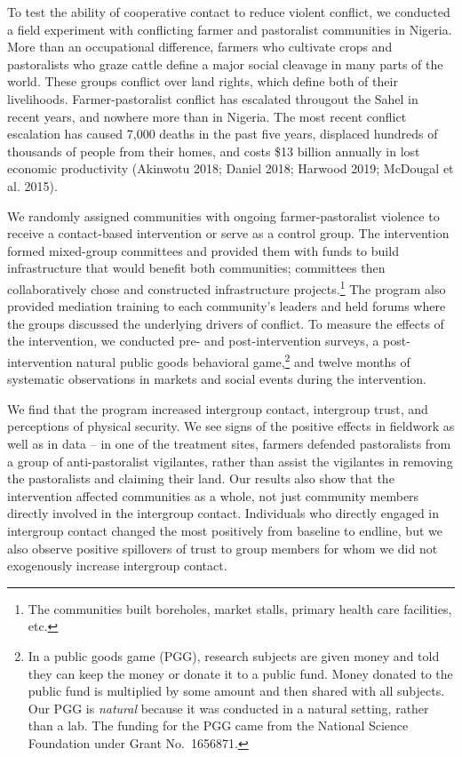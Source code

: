 \documentclass[11pt]{article}
\begin{document}
To test the ability of cooperative contact to reduce violent conflict,
we conducted a field experiment with conflicting farmer and pastoralist
communities in Nigeria. More than an occupational difference, farmers
who cultivate crops and pastoralists who graze cattle define a major
social cleavage in many parts of the world. These groups conflict over
land rights, which define both of their livelihoods. Farmer-pastoralist
conflict has escalated througout the Sahel in recent years, and nowhere
more than in Nigeria. The most recent conflict escalation has caused
7,000 deaths in the past five years, displaced hundreds of thousands of
people from their homes, and costs \$13 billion annually in lost
economic productivity (Akinwotu 2018; Daniel 2018; Harwood 2019;
McDougal et al. 2015).

We randomly assigned communities with ongoing farmer-pastoralist
violence to receive a contact-based intervention or serve as a control
group. The intervention formed mixed-group committees and provided them
with funds to build infrastructure that would benefit both communities;
committees then collaboratively chose and constructed infrastructure
projects.\footnote{The communities built boreholes, market stalls,
  primary health care facilities, etc.} The program also provided
mediation training to each community's leaders and held forums where the
groups discussed the underlying drivers of conflict. To measure the
effects of the intervention, we conducted pre- and post-intervention
surveys, a post-intervention natural public goods behavioral
game,\footnote{In a public goods game (PGG), research subjects are given
  money and told they can keep the money or donate it to a public fund.
  Money donated to the public fund is multiplied by some amount and then
  shared with all subjects. Our PGG is \emph{natural} because it was
  conducted in a natural setting, rather than a lab. The funding for the
  PGG came from the National Science Foundation under Grant No.~1656871.}
and twelve months of systematic observations in markets and social
events during the intervention.

We find that the program increased intergroup contact, intergroup trust,
and perceptions of physical security. We see signs of the positive
effects in fieldwork as well as in data -- in one of the treatment
sites, farmers defended pastoralists from a group of anti-pastoralist
vigilantes, rather than assist the vigilantes in removing the
pastoralists and claiming their land. Our results also show that the
intervention affected communities as a whole, not just community members
directly involved in the intergroup contact. Individuals who directly
engaged in intergroup contact changed the most positively from baseline
to endline, but we also observe positive spillovers of trust to group
members for whom we did not exogenously increase intergroup contact.
\end{document}
